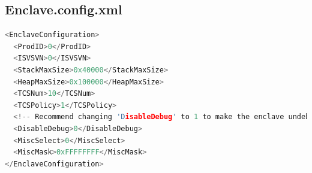\documentclass{article}
\begin{document}
\subsection*{Enclave.config.xml}

\begin{lstlisting}[language=c++]
<EnclaveConfiguration>
  <ProdID>0</ProdID>
  <ISVSVN>0</ISVSVN>
  <StackMaxSize>0x40000</StackMaxSize>
  <HeapMaxSize>0x100000</HeapMaxSize>
  <TCSNum>10</TCSNum>
  <TCSPolicy>1</TCSPolicy>
  <!-- Recommend changing 'DisableDebug' to 1 to make the enclave undebuggable for enclave release -->
  <DisableDebug>0</DisableDebug>
  <MiscSelect>0</MiscSelect>
  <MiscMask>0xFFFFFFFF</MiscMask>
</EnclaveConfiguration>
\end{lstlisting}
\end{document}
